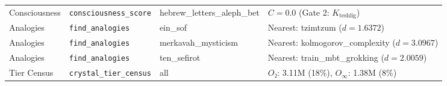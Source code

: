 \documentclass[12pt,a4paper]{article}
\begin{document}
\begin{table}[htbp]
\begin{tabularx}{\textwidth}{>{\centering\arraybackslash}X >{\centering\arraybackslash}X >{\centering\arraybackslash}X >{\centering\arraybackslash}X}
Consciousness & \texttt{consciousness\_score} & hebrew\_letters\_aleph\_bet & $C = 0.0$ (Gate 2: $K_{\text{teshlig}}$) \\
Analogies & \texttt{find\_analogies} & ein\_sof & Nearest: tzimtzum ($d = 1.6372$) \\
Analogies & \texttt{find\_analogies} & merkavah\_mysticism & Nearest: kolmogorov\_complexity ($d = 3.0967$) \\
Analogies & \texttt{find\_analogies} & ten\_sefirot & Nearest: train\_mbt\_grokking ($d = 2.0059$) \\
Tier Census & \texttt{crystal\_tier\_census} & all & $O₂$: 3.11M (18\%), $O_{\infty}$: 1.38M (8\%) \\
\bottomrule
\end{tabularx}
\end{table}
\end{document}
